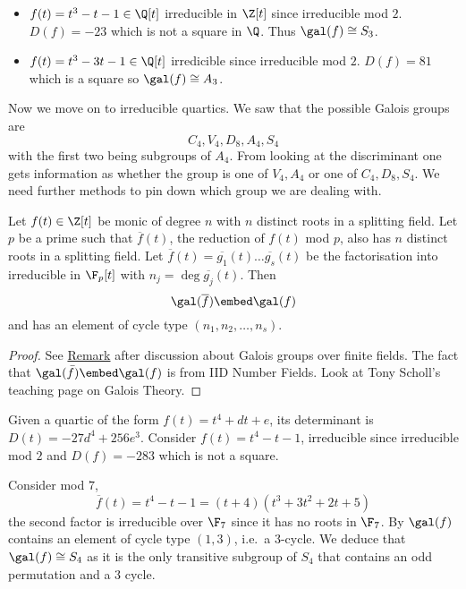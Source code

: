 \documentclass[a4paper]{article}
\newcommand*{\red}[1]{\overline{#1}}
\begin{document}
\begin{eg}\leavevmode
  \begin{itemize}
  \item \(f(t) = t^3 - t - 1 \in \Q[t]\) irreducible in \(\Z[t]\) since irreducible mod \(2\). \(D(f) = -23\) which is not a square in \(\Q\). Thus \(\gal(f) \cong S_3\).
  \item \(f(t) = t^3 - 3t - 1 \in \Q[t]\) irredicible since irreducible mod \(2\). \(D(f) = 81\) which is a square so \(\gal(f) \cong A_3\).
  \end{itemize}
\end{eg}

Now we move on to irreducible quartics. We saw that the possible Galois groups are
\[
  C_4, V_4, D_8, A_4, S_4
\]
with the first two being subgroups of \(A_4\). From looking at the discriminant one gets information as whether the group is one of \(V_4, A_4\) or one of \(C_4, D_8, S_4\). We need further methods to pin down which group we are dealing with.

\begin{theorem}
  \label{thm:mod p reduction}
  Let \(f(t) \in \Z[t]\) be monic of degree \(n\) with \(n\) distinct roots in a splitting field. Let \(p\) be a prime such that \(\red f(t)\), the reduction of \(f(t)\) mod \(p\), also has \(n\) distinct roots in a splitting field. Let \(\red f(t) = \red{g_1}(t) \dots \red{g_s}(t)\) be the factorisation into irreducible in \(\F_p[t]\) with \(n_j =  \deg \red{g_j}(t)\). Then
  \[
    \gal(\red f) \embed \gal(f)
  \]
  and has an element of cycle type \((n_1, n_2, \dots, n_s)\).
\end{theorem}

\begin{proof}
  See \hyperref[rmk:mod p reduction]{Remark} after discussion about Galois groups over finite fields. The fact that \(\gal(\bar f) \embed \gal(f)\) is from IID Number Fields. Look at Tony Scholl's teaching page on Galois Theory.
\end{proof}

\begin{eg}
  Given a quartic of the form \(f(t) = t^4 + dt + e\), its determinant is \(D(t) = -27d^4 + 256e^3\). Consider \(f(t) = t^4 - t -1\), irreducible since irreducible mod \(2\) and \(D(f) = -283\) which is not a square.

  Consider mod \(7\),
  \[
    \red f(t) = t^4 - t - 1 = (t + 4)(t^3 + 3t^2 + 2t + 5)
  \]
  the second factor is irreducible over \(\F_7\) since it has no roots in \(\F_7\). By  \(\gal(f)\) contains an element of cycle type \((1, 3)\), i.e.\ a \(3\)-cycle. We deduce that \(\gal(f) \cong S_4\) as it is the only transitive subgroup of \(S_4\) that contains an odd permutation and a \(3\) cycle.
\end{eg}
\end{document}
